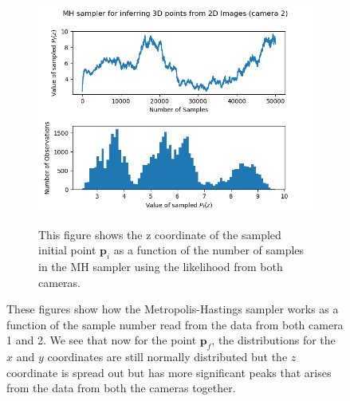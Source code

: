 \documentclass[10pt]{article}
\begin{document}
\begin{figure}[h!]
\begin{subfigure}[]{.320\textwidth}
\end{subfigure}
\begin{subfigure}[]{.320\textwidth}
  \centering
  \includegraphics[width=1\linewidth]{figures/p_f_z12.png}
  \label{fig:t4pif}
\caption{This figure shows the z coordinate of the sampled initial point $\mathbf{p}_i$ as a function of the number of samples in the MH sampler using the likelihood from both cameras.}
\end{subfigure}
\caption{These figures show how the Metropolis-Hastings sampler works as a function of the sample number read from the data from both camera 1 and 2. We see that now for the point $\mathbf{p}_f$, the distributions for the $x$ and $y$ coordinates are still normally distributed but the $z$ coordinate is spread out but has more significant peaks that arises from the data from both the cameras together.}

\end{figure}
\end{document}
